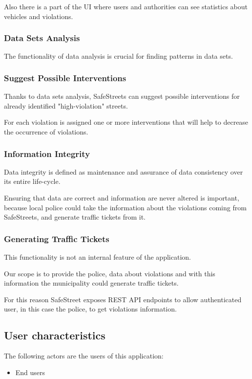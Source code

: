 Also there is a part of the UI where users and authorities can see statistics about vehicles and violations.

\subsubsection{Data Sets Analysis}
The functionality of data analysis is crucial for finding patterns in data sets.

\subsubsection{Suggest Possible Interventions}
Thanks to data sets analysis, SafeStreets can suggest possible interventions for already identified "high-violation" streets.

For each violation is assigned one or more interventions that will help to decrease the occurrence of violations.


\subsubsection{Information Integrity}
Data integrity is defined as maintenance and assurance of data consistency over its entire life-cycle.

Ensuring that data are correct and information are never altered is important, because local police could take the information about the violations coming from SafeStreets, and generate traffic tickets from it.

\subsubsection{Generating Traffic Tickets}
This functionality is not an internal feature of the application. 

Our scope is to provide the police, data about violations and with this information the municipality could generate traffic tickets.

For this reason SafeStreet exposes REST API endpoints to allow authenticated user, in this case the police, to get violations information.


\subsection{User characteristics}

The following actors are the users of this application:

\begin{itemize}
	\item End users
\end{itemize}

